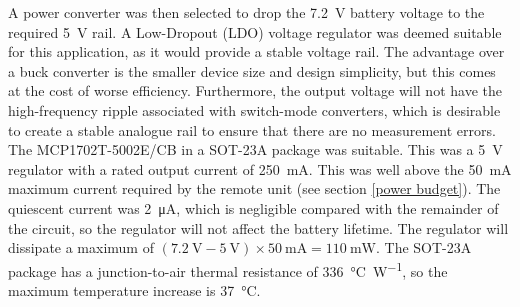 
A power converter was then selected to drop the \SI{7.2}{\volt} battery voltage to the required \SI{5}{\volt} rail. A Low-Dropout (LDO) voltage regulator was deemed suitable for this application, as it would provide a stable voltage rail. The advantage over a buck converter is the smaller device size and design simplicity, but this comes at the cost of worse efficiency. Furthermore, the output voltage will not have the high-frequency ripple associated with switch-mode converters, which is desirable to create a stable analogue rail to ensure that there are no measurement errors. The MCP1702T-5002E/CB \cite{mcp1702} in a SOT-23A package was suitable. This was a \SI{5}{\volt} regulator with a rated output current of \SI{250}{\milli\ampere}. This was well above the \SI{50}{\milli\ampere} maximum current required by the remote unit (see section \ref{power budget}). The quiescent current was \SI{2}{\micro\ampere}, which is negligible compared with the remainder of the circuit, so the regulator will not affect the battery lifetime. The regulator will dissipate a maximum of $(\SI{7.2}{\volt}-\SI{5}{\volt})\times\SI{50}{\milli\ampere}=\SI{110}{\milli\watt}$. The SOT-23A package has a junction-to-air thermal resistance of \SI{336}{\celsius\per\watt}, so the maximum temperature increase is \SI{37}{\celsius}.\\

